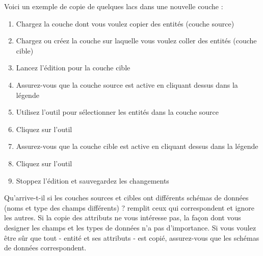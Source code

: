 Voici un exemple de copie de quelques lacs dans une nouvelle couche :

\begin{enumerate}
\item Chargez la couche dont vous voulez copier des entités (couche source)
\item Chargez ou créez la couche sur laquelle vous voulez coller des entités (couche cible)
\item Lancez l'édition pour la couche cible
\item Assurez-vous que la couche source est active en cliquant dessus dans la légende
\item Utilisez l'outil  pour sélectionner les entités dans la couche source
\item Cliquez sur l'outil 
\item Assurez-vous que la couche cible est active en cliquant dessus dans la légende
\item Cliquez sur l'outil 
\item Stoppez l'édition et sauvegardez les changements
\end{enumerate}

Qu'arrive-t-il si les couches sources et cibles ont différents schémas de données (noms et type des champs différents) ? \qg remplit ceux qui correspondent et ignore les autres. Si la copie des attributs ne vous intéresse pas, la façon dont vous designer les champs et les types de données n'a pas d'importance. Si vous voulez être sûr que tout - entité et ses attributs - est copié, assurez-vous que les schémas de données correspondent.

